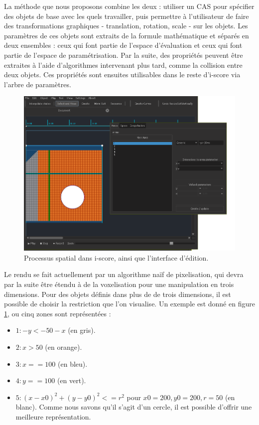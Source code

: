 \documentclass[french,12pt]{article}
\begin{document}
La méthode que nous proposons combine les deux : utiliser un \ac{CAS} pour spécifier des objets de base avec les quels travailler, puis permettre à l'utilisateur de faire des transformations graphiques - translation, rotation, scale - sur les objets. Les paramètres de ces objets sont extraits de la formule mathématique et séparés en deux ensembles : ceux qui font partie de l'espace d'évaluation et ceux qui font partie de l'espace de paramétrisation. Par la suite, des propriétés peuvent être extraites à l'aide d'algorithmes intervenant plus tard, comme la collision entre deux objets. Ces propriétés sont ensuites utilisables dans le reste d'i-score via l'arbre de paramètres.

\begin{figure}[h]
    \centering
    \includegraphics[scale=0.5]{images/space.png}
    \caption{Processus spatial dans i-score, ainsi que l'interface d'édition.}
    \label{fig.space.iscore}
\end{figure} 

Le rendu se fait actuellement par un algorithme naïf de pixelisation, qui devra par la suite être étendu à de la voxelisation pour une manipulation en trois dimensions. Pour des objets définis dans plus de de trois dimensions, il est possible de choisir la restriction que l'on visualise. Un exemple est donné en figure \ref{fig.space.iscore}, ou cinq zones sont représentées : 
\begin{itemize}
    \item  $1: -y < -50 - x$ (en gris).
    \item $ 2: x > 50$  (en orange).
    \item  $3: x == 100$ (en bleu).
    \item  $4: y == 100$ (en vert).
    \item $5: (x - x0)^2 + (y - y0) ^2 <= r^2$ pour $x0 = 200, y0 = 200, r = 50 $ (en blanc). Comme nous savons qu'il s'agit d'un cercle, il est possible d'offrir une meilleure représentation.
\end{itemize}
\end{document}
